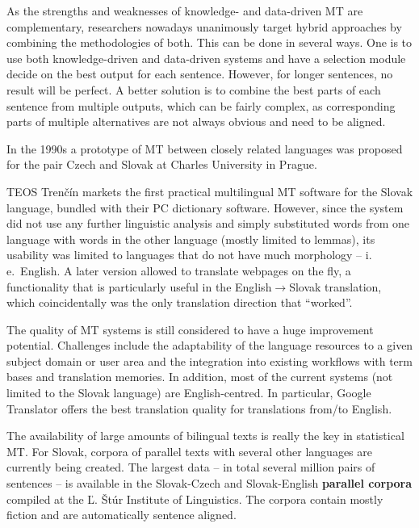 \begin{multicols}{2}
As the strengths and weaknesses of knowledge- and data-driven MT are complementary, researchers nowadays unanimously target hybrid approaches by combining the methodologies of both. This can be done in several ways. One is to use both knowledge-driven and data-driven systems and have a selection module decide on the best output for each sentence. However, for longer sentences, no result will be perfect. A better solution is to combine the best parts of each sentence from multiple outputs, which can be fairly complex, as corresponding parts of multiple alternatives are not always obvious and need to be aligned. 

In the 1990s a prototype of MT between closely related languages was proposed for the pair Czech and Slovak at Charles University in Prague.

TEOS Trenčín markets the first practical multilingual MT software for the Slovak language, bundled with their PC dictionary software. However, since the system did not use any further linguistic analysis and simply substituted words from one language with words in the other language (mostly limited to lemmas), its usability was limited to languages that do not have much morphology – i.\,e.~English. A later version allowed to translate webpages on the fly, a functionality that is particularly useful in the English$\rightarrow$Slovak translation, which coincidentally was the only translation direction that “worked”.

The quality of MT systems is still considered to have a huge improvement potential. Challenges include the adaptability of the language resources to a given subject domain or user area and the integration into existing workflows with term bases and translation memories. In addition, most of the current systems (not limited to the Slovak language) are English-centred. In particular, Google Translator offers the best translation quality for translations from/to English.

The availability of large amounts of bilingual texts is really the key in statistical MT. For Slovak, corpora of parallel texts with several other languages are currently being created. The largest data – in total several million pairs of sentences – is available in the Slovak-Czech and Slovak-English \textbf{parallel corpora} compiled at the Ľ. Štúr Institute of Linguistics. The corpora contain mostly fiction and are automatically sentence aligned.



\end{multicols}

